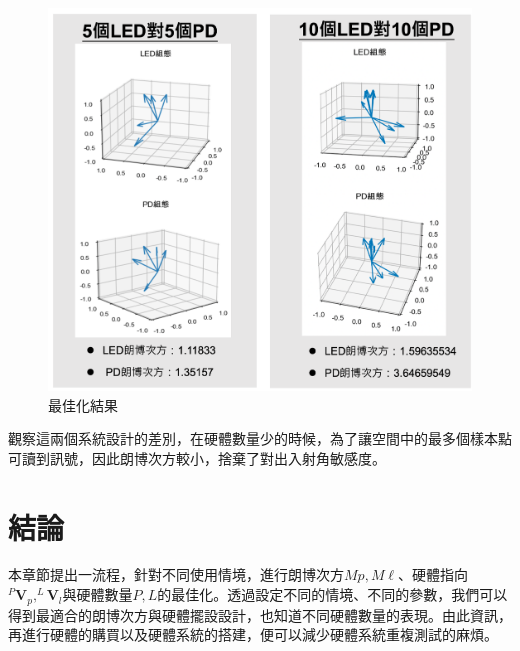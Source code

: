     \begin{figure}[h!]
        \centering
        \includegraphics[width=15cm]{ch5pic/opt_result.png}
        \caption{最佳化結果}
        \label{pic:opt_result}
    \end{figure}

    觀察這兩個系統設計的差別，在硬體數量少的時候，為了讓空間中的最多個樣本點可讀到訊號，因此朗博次方較小，捨棄了對出入射角敏感度。



\section{結論}

本章節提出一流程，針對不同使用情境，進行朗博次方$Mp,M\ell$、硬體指向$^{P}\boldsymbol{V}_p,^{L}\boldsymbol{V}_l$與硬體數量$P,L$的最佳化。透過設定不同的情境、不同的參數，我們可以得到最適合的朗博次方與硬體擺設設計，也知道不同硬體數量的表現。由此資訊，再進行硬體的購買以及硬體系統的搭建，便可以減少硬體系統重複測試的麻煩。









